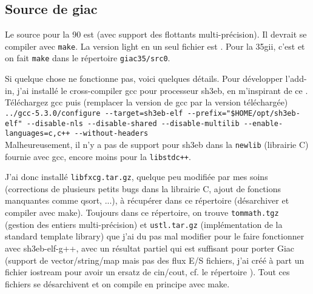 \documentclass{article}
\begin{document}
\begin{giacjshere}
\subsection{Source de giac}
Le source pour la 90 est 
(avec support des flottants multi-pr\'ecision). Il devrait se compiler avec
\verb|make|.
La version light en un seul fichier est 
.
Pour la 35gii, c'est
et on fait \verb|make| dans le r\'epertoire \verb|giac35/src0|.

Si quelque chose ne fonctionne pas, voici quelques d\'etails.
Pour d\'evelopper l'add-in, j'ai install\'e le cross-compiler
gcc pour processeur sh3eb, en m'inspirant de ce
.
T\'el\'echargez gcc puis 
(remplacer la version de gcc par la version t\'el\'echarg\'ee)\\
\verb|../gcc-5.3.0/configure --target=sh3eb-elf --prefix="$HOME/opt/sh3eb-elf" --disable-nls --disable-shared --disable-multilib --enable-languages=c,c++ --without-headers|\\
Malheureusement, il n'y a pas de support pour sh3eb dans la \verb|newlib|
(librairie C) fournie avec gcc, encore moins pour la \verb|libstdc++|.

J'ai donc install\'e \verb|libfxcg.tar.gz|, 
quelque peu modifi\'ee par mes soins 
(corrections de plusieurs petits bugs dans la librairie C, ajout
de fonctions manquantes comme qsort, ...), \`a r\'ecup\'erer dans
{ce r\'epertoire} (d\'esarchiver et compiler avec make). Toujours
dans ce r\'epertoire, on trouve \verb|tommath.tgz| (gestion des
entiers multi-pr\'ecision) et \verb|ustl.tar.gz| (impl\'ementation
de la standard template library) que j'ai du pas mal modifier
pour le faire fonctionner avec sh3eb-elf-g++, avec un r\'esultat
partiel qui est suffisant pour porter Giac (support de vector/string/map
mais pas des flux E/S fichiers, j'ai cr\'e\'e \`a part un fichier
iostream pour avoir un ersatz de cin/cout, cf. le r\'epertoire 
). 
Tout ces fichiers se d\'esarchivent
et on compile en principe avec make.


\end{giacjshere}
\end{document}
